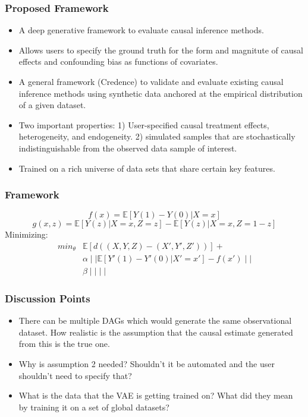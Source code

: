 \documentclass{beamer}
\begin{document}
\begin{frame}
	\frametitle{Proposed Framework}
	\begin{itemize}
		\item A deep generative framework to evaluate causal inference methods.
		\item Allows users to specify the ground truth for the form and magnitute of causal effects and confounding bias as functions of covariates.
		\item A general framework (Credence) to validate and evaluate existing causal inference methods using synthetic data anchored at the empirical distribution of a given dataset.
		\item Two important properties: 1) User-specified causal treatment effects, heterogeneity, and endogeneity. 2) simulated samples that are stochastically indistinguishable from the observed data sample of interest.
		\item Trained on a rich universe of data sets that share certain key features.
	\end{itemize}
\end{frame}

\begin{frame}
	\frametitle{Framework}
	$$ f(x) = \mathbb{E}[Y(1) - Y(0)| X=x] $$
	$$ g(x, z) = \mathbb{E}[Y(z) | X=x, Z=z] - \mathbb{E}[Y(z) | X=x, Z=1-z ] $$
	Minimizing:
\begin{equation}
	\begin{split}
	\textit{min}_{\theta} & \mathbb{E}[d((X, Y, Z) - (X', Y', Z'))] + \\
			& \alpha \mid\mid \mathbb{E}[Y'(1) - Y'(0) | X'=x'] - f(x') \mid\mid \\
			& \beta \mid\mid \mid\mid
\end{split}
\end{equation}
\end{frame}

\begin{frame}
	\frametitle{Discussion Points}
	\begin{itemize}
		\item There can be multiple DAGs which would generate the same observational dataset. How realistic is the assumption that the causal estimate generated from this is the true one.
		\item Why is assumption 2 needed? Shouldn't it be automated and the user shouldn't need to specify that?
		\item What is the data that the VAE is getting trained on? What did they mean by training it on a set of global datasets?
	\end{itemize}
\end{frame}
\end{document}

